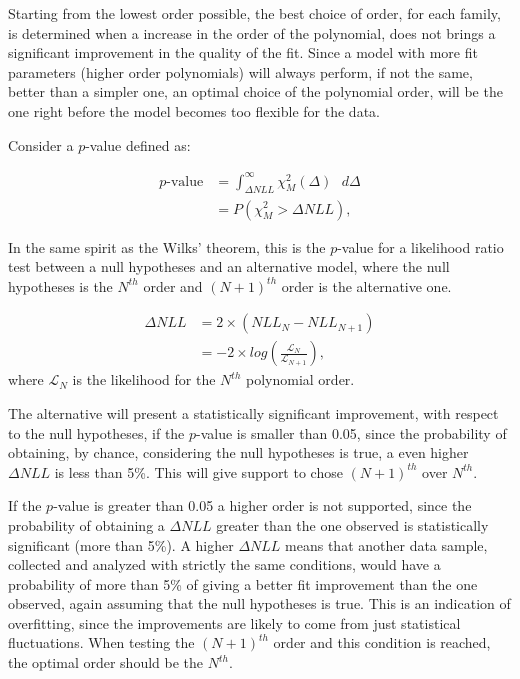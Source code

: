 
Starting from the lowest order possible, the best choice of order, for each family, is determined when a increase in the order of the polynomial, does not brings a significant improvement in the quality of the fit. Since a model with more fit parameters (higher order polynomials) will always perform, if not the same, better than a simpler one, an optimal choice of the polynomial order, will be the one right before the model becomes too flexible for the data.

Consider a $p$-value defined as: 

\begin{equation}
\label{eqn:p-value_f_test}
\begin{split}
 p\text{-value} & = \int^{\infty}_{\Delta NLL} \chi^2_M(\Delta) \text{ } d\Delta\\
& = P(\chi^2_M > \Delta NLL)  ,
\end{split}
\end{equation}

In the same spirit as the Wilks' theorem, this is the $p$-value for a likelihood ratio test between a null hypotheses and an alternative model, where the null hypotheses is the $N^{th}$ order and $(N+1)^{th}$ order is the alternative one.

\begin{equation}
\label{eqn:likehood_ratio}
\begin{split}
 \Delta NLL & = 2 \times (NLL_{N} - NLL_{N+1}) \\
  & = -2 \times log(\frac{\mathcal{L}_N}{\mathcal{L}_{N+1}}),
\end{split}
\end{equation}
where $\mathcal{L}_N$ is the likelihood for the $N^{th}$ polynomial order.

The alternative will present a statistically significant improvement, with respect to the null hypotheses, if the $p$-value is smaller than 0.05, since the probability of obtaining, by chance, considering the null hypotheses is true, a even higher $\Delta NLL$ is less than 5\%. This will give support to chose $(N+1)^{th}$ over $N^{th}$.

If the $p$-value is greater than 0.05 a higher order is not supported, since the probability of obtaining a $\Delta NLL$ greater than the one observed is statistically significant (more than 5\%). A higher $\Delta NLL$ means that another data sample, collected and analyzed with strictly the same conditions, would have a probability of more than 5\% of giving a better fit improvement than the one observed, again assuming that the null hypotheses is true. This is an indication of overfitting, since the improvements are likely to come from just statistical fluctuations. When testing the $(N+1)^{th}$ order and this condition is reached, the optimal order should be the $N^{th}$.

